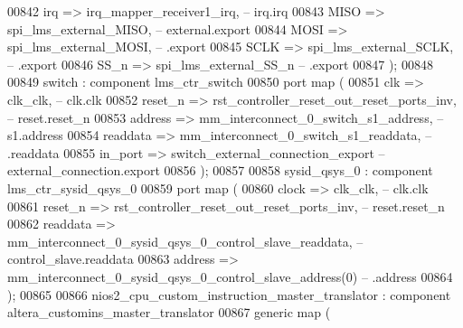 \begin{DoxyCode}
00842             irq           => irq_mapper_receiver1_irq,\textcolor{keyword}{                                   --             
       irq.irq}
00843             MISO          => spi_lms_external_MISO,\textcolor{keyword}{                                      --        
       external.export}
00844             MOSI          => spi_lms_external_MOSI,\textcolor{keyword}{                                      --                
       .export}
00845             SCLK          => spi_lms_external_SCLK,\textcolor{keyword}{                                      --                
       .export}
00846             SS\_n          => spi_lms_external_SS_n                                       \textcolor{keyword}{--                
       .export}
00847         \textcolor{vhdlchar}{)};
00848 
00849     switch : \textcolor{keywordflow}{component} lms\_ctr\_switch
00850         \textcolor{keywordflow}{port} \textcolor{keywordflow}{map} (
00851             clk      => clk_clk,\textcolor{keyword}{                                  --                 clk.clk}
00852             reset\_n  => rst_controller_reset_out_reset_ports_inv,\textcolor{keyword}{ --               reset.reset\_n}
00853             address  => mm_interconnect_0_switch_s1_address,\textcolor{keyword}{      --                  s1.address}
00854             readdata => mm_interconnect_0_switch_s1_readdata,\textcolor{keyword}{     --                    .readdata}
00855             in\_port  => switch_external_connection_export         \textcolor{keyword}{-- external\_connection.export}
00856         \textcolor{vhdlchar}{)};
00857 
00858     sysid_qsys_0 : \textcolor{keywordflow}{component} lms\_ctr\_sysid\_qsys\_0
00859         \textcolor{keywordflow}{port} \textcolor{keywordflow}{map} (
00860             clock    => clk_clk,\textcolor{keyword}{                                                 --           clk.clk}
00861             reset\_n  => rst_controller_reset_out_reset_ports_inv,\textcolor{keyword}{                --         reset.reset\_n}
00862             readdata => mm_interconnect_0_sysid_qsys_0_control_slave_readdata,\textcolor{keyword}{   -- control\_slave.readdata}
00863             address  => mm_interconnect_0_sysid_qsys_0_control_slave_address\textcolor{vhdlchar}{(}\textcolor{vhdllogic}{0}\textcolor{vhdlchar}{)}\textcolor{keyword}{  --              .address}
00864         \textcolor{vhdlchar}{)};
00865 
00866     nios2_cpu_custom_instruction_master_translator : \textcolor{keywordflow}{component} altera\_customins\_master\_translator
00867         \textcolor{keywordflow}{generic} \textcolor{keywordflow}{map} (

\end{DoxyCode}
